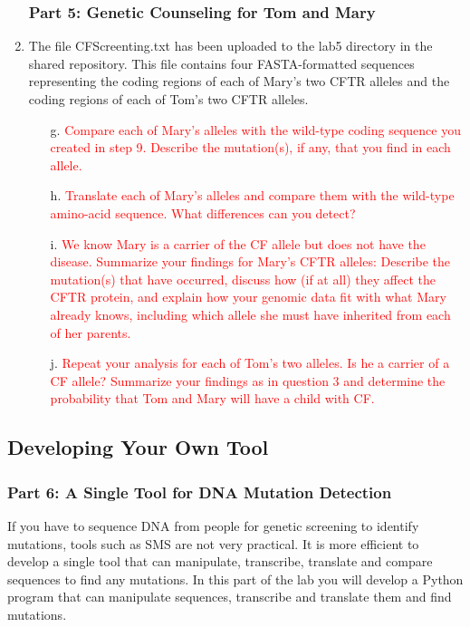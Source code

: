 \begin{enumerate}
	\subsubsection*{Part 5:  Genetic Counseling for Tom and Mary}
	\item  The file CFScreenting.txt has been uploaded to the lab5 directory in the shared repository. This file contains four FASTA-formatted sequences representing the coding regions of each of Mary’s two CFTR alleles and the coding regions of each of Tom’s two CFTR alleles.
	\begin{itemize}
		\item[g.]  \textcolor{red}{Compare each of Mary's alleles with the wild-type coding sequence you created in step 9.  Describe the mutation(s), if any, that you find in each allele.}
		\item[h.] \textcolor{red}{Translate each of Mary's alleles and compare them with the wild-type amino-acid sequence.  What differences can you detect?}
		\item[i.] \textcolor{red}{We know Mary is a carrier of the CF allele but does not have the disease.  Summarize your findings for Mary's CFTR alleles:  Describe the mutation(s) that have occurred, discuss how (if at all) they affect the CFTR protein, and explain how your genomic data fit with what Mary already knows, including which allele she must have inherited from each of her parents.}
		\item[j.] \textcolor{red}{Repeat your analysis for each of Tom's two alleles.  Is he a carrier of a CF allele?  Summarize your findings as in question 3 and determine the probability that Tom and Mary will have a child with CF. }
	\end{itemize}
\end{enumerate}


\vspace*{-.1in}
\subsection*{Developing Your Own Tool}
\vspace*{-.1in} 

	\subsubsection*{Part 6: A Single Tool for DNA Mutation Detection}

If you have to sequence DNA from people for genetic screening to identify mutations, tools such as SMS are not very practical. It is more efficient to develop a single tool that can manipulate, transcribe, translate and compare sequences to find any mutations. In this part of the lab you will develop a Python program that can manipulate sequences, transcribe and translate them and find mutations. 

